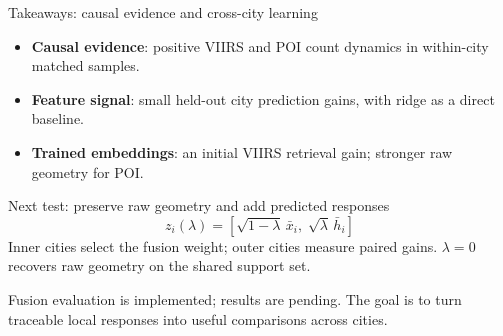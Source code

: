 \documentclass[aspectratio=169,11pt]{beamer}
\newcommand{\key}[1]{\textbf{\color{blue!55!black}#1}}
\begin{document}
\begin{frame}{Takeaways: causal evidence and cross-city learning}
\small
\begin{itemize}
 \item \key{Causal evidence}: positive VIIRS and POI count dynamics in within-city matched samples.
 \item \key{Feature signal}: small held-out city prediction gains, with ridge as a direct baseline.
 \item \key{Trained embeddings}: an initial VIIRS retrieval gain; stronger raw geometry for POI.
\end{itemize}
\begin{block}{Next test: preserve raw geometry and add predicted responses}
\[
z_i(\lambda)=[\sqrt{1-\lambda}\,\bar x_i,\;\sqrt{\lambda}\,\bar h_i]
\]
Inner cities select the fusion weight; outer cities measure paired gains.
$\lambda=0$ recovers raw geometry on the shared support set.
\end{block}
\footnotesize Fusion evaluation is implemented; results are pending.
The goal is to turn traceable local responses into useful comparisons across cities.
\end{frame}
\end{document}

